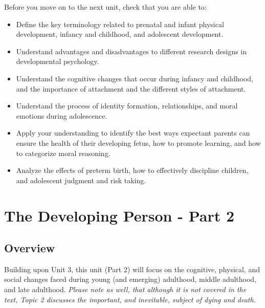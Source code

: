 \documentclass[
]{book}
\providecommand{\tightlist}{%
  \setlength{\itemsep}{0pt}\setlength{\parskip}{0pt}}
\begin{document}
\begin{progress}
Before you move on to the next unit, check that you are able to:

\begin{itemize}
\tightlist
\item
  Define the key terminology related to prenatal and infant physical development, infancy and childhood, and adolescent development.\\
\item
  Understand advantages and disadvantages to different research designs in developmental psychology.\\
\item
  Understand the cognitive changes that occur during infancy and childhood, and the importance of attachment and the different styles of attachment.\\
\item
  Understand the process of identity formation, relationships, and moral emotions during adolescence.\\
\item
  Apply your understanding to identify the best ways expectant parents can ensure the health of their developing fetus, how to promote learning, and how to categorize moral reasoning.\\
\item
  Analyze the effects of preterm birth, how to effectively discipline children, and adolescent judgment and risk taking.
\end{itemize}
\end{progress}

\hypertarget{the-developing-person---part-2}{%
\chapter{The Developing Person - Part 2}\label{the-developing-person---part-2}}

\hypertarget{overview-3}{%
\section*{Overview}\label{overview-3}}

Building upon Unit 3, this unit (Part 2) will focus on the cognitive, physical, and social changes faced during young (and emerging) adulthood, middle adulthood, and late adulthood. \emph{Please note as well, that although it is not covered in the text, Topic 2 discusses the important, and inevitable, subject of dying and death.}
\end{document}
